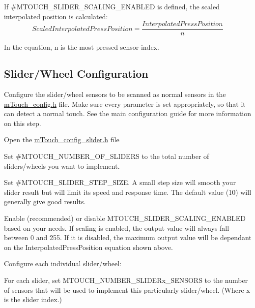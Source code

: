 If \#\+M\+T\+O\+U\+C\+H\+\_\+\+S\+L\+I\+D\+E\+R\+\_\+\+S\+C\+A\+L\+I\+N\+G\+\_\+\+E\+N\+A\+B\+L\+E\+D is defined, the scaled interpolated position is calculated\+: \[ Scaled Interpolated Press Position = \frac{InterpolatedPressPosition}{n} \]

In the equation, n is the most pressed sensor index.  \hypertarget{feat_sliders_featSlider-Config}{}\subsection{Slider/\+Wheel Configuration}\label{feat_sliders_featSlider-Config}

\begin{DoxyEnumerate}
\item Configure the slider/wheel sensors to be scanned as normal sensors in the \hyperlink{m_touch__config_8h}{m\+Touch\+\_\+config.\+h} file. Make sure every parameter is set appropriately, so that it can detect a normal touch. See the main configuration guide for more information on this step. 
\item Open the \hyperlink{m_touch__config__slider_8h}{m\+Touch\+\_\+config\+\_\+slider.\+h} file 
\begin{DoxyEnumerate}
\item Set \#\+M\+T\+O\+U\+C\+H\+\_\+\+N\+U\+M\+B\+E\+R\+\_\+\+O\+F\+\_\+\+S\+L\+I\+D\+E\+R\+S to the total number of sliders/wheels you want to implement. 
\item Set \#\+M\+T\+O\+U\+C\+H\+\_\+\+S\+L\+I\+D\+E\+R\+\_\+\+S\+T\+E\+P\+\_\+\+S\+I\+Z\+E. A small step size will smooth your slider result but will limit its speed and response time. The default value (10) will generally give good results. 
\item Enable (recommended) or disable M\+T\+O\+U\+C\+H\+\_\+\+S\+L\+I\+D\+E\+R\+\_\+\+S\+C\+A\+L\+I\+N\+G\+\_\+\+E\+N\+A\+B\+L\+E\+D based on your needs. If scaling is enabled, the output value will always fall between 0 and 255. If it is disabled, the maximum output value will be dependant on the Interpolated\+Press\+Position equation shown above. 
\item Configure each individual slider/wheel\+: 
\begin{DoxyItemize}
\item For each slider, set M\+T\+O\+U\+C\+H\+\_\+\+N\+U\+M\+B\+E\+R\+\_\+\+S\+L\+I\+D\+E\+Rx\+\_\+\+S\+E\+N\+S\+O\+R\+S to the number of sensors that will be used to implement this particularly slider/wheel. (Where \textquotesingle{}x\textquotesingle{} is the slider index.)


\end{DoxyItemize}
\end{DoxyEnumerate}
\end{DoxyEnumerate}
